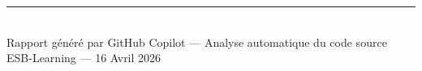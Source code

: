 \documentclass[12pt,a4paper]{article}
\begin{document}
\vfill
\begin{center}
\rule{0.8\textwidth}{0.4pt}\\[6pt]
{\small\color{gray} Rapport généré par GitHub Copilot --- Analyse automatique du code source ESB-Learning --- 16 Avril 2026}
\end{center}
\end{document}
